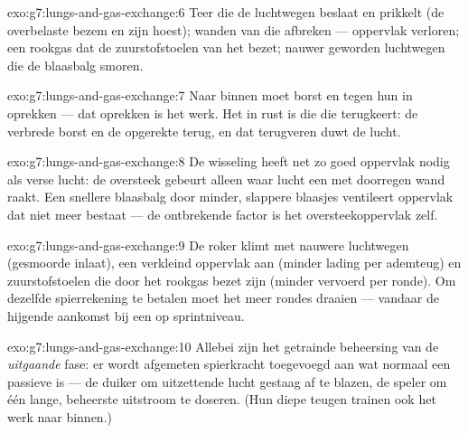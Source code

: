 \begin{solution}{exo:g7:lungs-and-gas-exchange:6}
Teer die de luchtwegen beslaat en prikkelt (de overbelaste bezem en zijn
hoest); wanden van  die afbreken --- oppervlak verloren; een
rookgas dat de zuurstofstoelen van het  bezet; nauwer geworden
luchtwegen die de blaasbalg smoren.
\end{solution}

\begin{solution}{exo:g7:lungs-and-gas-exchange:7}
Naar binnen moet borst en  tegen hun  in oprekken --- dat
oprekken is het werk. Het  in rust is die  die terugkeert: de
verbrede borst en de opgerekte   terug, en dat terugveren duwt
de lucht.
\end{solution}

\begin{solution}{exo:g7:lungs-and-gas-exchange:8}
De wisseling heeft net zo goed oppervlak nodig als verse lucht: de
oversteek gebeurt alleen waar lucht een met  doorregen wand raakt.
Een snellere blaasbalg door minder, slappere blaasjes ventileert oppervlak
dat niet meer bestaat --- de ontbrekende factor is het oversteekoppervlak
zelf.
\end{solution}

\begin{solution}{exo:g7:lungs-and-gas-exchange:9}
De roker klimt met nauwere luchtwegen (gesmoorde inlaat), een verkleind
oppervlak aan  (minder lading per ademteug) en zuurstofstoelen
die door het rookgas bezet zijn (minder vervoerd per ronde). Om dezelfde
spierrekening te betalen moet het  meer rondes draaien --- vandaar de
hijgende aankomst bij een  op sprintniveau.
\end{solution}

\begin{solution}{exo:g7:lungs-and-gas-exchange:10}
Allebei zijn het getrainde beheersing van de \emph{uitgaande} fase: er
wordt afgemeten spierkracht toegevoegd aan wat normaal een passieve 
is --- de duiker om uitzettende lucht gestaag af te blazen, de speler om
één lange, beheerste uitstroom te doseren. (Hun diepe teugen trainen ook
het werk naar binnen.)
\end{solution}

